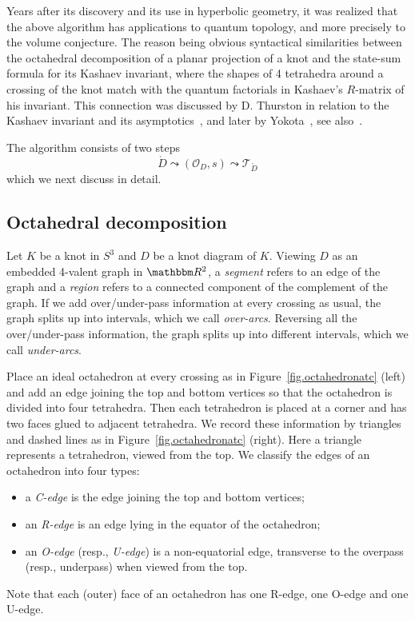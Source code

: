\documentclass[12pt,reqno]{amsart}
\theoremstyle{definition}
\def\BR{\mathbbm R}
\def\calO{\mathcal O}
\def\calT{\mathcal T}
\def\be{\begin{equation}}
\def\ee{\end{equation}}
\renewcommand{\Ddot}{\mathring{D}}
\newcommand{\curly}{\mathrel{\leadsto}}
\begin{document}
Years after its discovery and its use in hyperbolic geometry, it was realized that
the above algorithm has applications to quantum topology, and more precisely to
the volume conjecture. The reason being obvious syntactical similarities between the
octahedral decomposition of a planar projection of a knot and the state-sum formula
for its Kashaev invariant, where the shapes of 4 tetrahedra around a crossing of the
knot match with the quantum factorials in Kashaev's $R$-matrix of his invariant.
This connection was discussed by D. Thurston in relation to the Kashaev invariant
and its asymptotics~\cite{Thu99}, and later by Yokota~\cite{Yokota02},
see also~\cite[Sec.8.2]{GL:asy}.
  
The algorithm consists of two steps
\be
\label{2steps}
\Ddot \curly (\calO_D,s) \curly \calT_{\Ddot}
\ee
which we next discuss in detail.

\subsection{Octahedral decomposition}
\label{sec.oc}

Let $K$ be a knot in $S^3$ and $D$ be a knot diagram of $K$.
Viewing $D$ as an embedded 4-valent graph  in $\BR^2$, a \emph{segment}
refers to an edge of the graph and a \emph{region} refers to a connected component
of the complement of the graph. If we add over/under-pass information at every
crossing as usual, the graph splits up into intervals, which we call \emph{over-arcs}.
Reversing all the over/under-pass information, the graph splits up into
different intervals, which we call \emph{under-arcs}.

Place an ideal octahedron at every crossing as in Figure~\ref{fig.octahedronatc}
(left) and add an edge joining the top and bottom vertices so that the
octahedron is divided into four tetrahedra. Then each tetrahedron is placed at
a corner and has two faces glued to adjacent tetrahedra. We record these
information by triangles and dashed lines as in Figure~\ref{fig.octahedronatc}
(right). Here a triangle represents a tetrahedron, viewed from the top.
We classify the edges of an octahedron into four types:
\begin{itemize}
\item
  a \emph{C-edge} is the edge  joining the top and bottom vertices; 
\item
  an \emph{R-edge} is an edge lying in the equator of the octahedron;
\item
  an \emph{O-edge} (resp., \emph{U-edge}) is a non-equatorial edge,
  transverse to the overpass (resp., underpass) when viewed from the top.
\end{itemize} 
Note that each (outer) face of an octahedron has one R-edge, one O-edge and
one U-edge.
\end{document}
